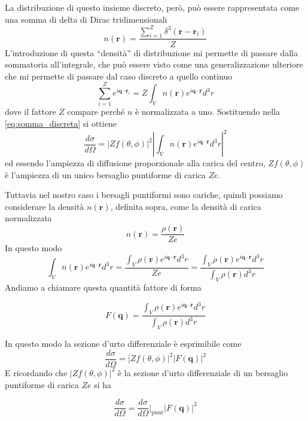 La distribuzione di questo insieme discreto, però, può essere rappresentata come una somma di delta di Dirac tridimensionali
\begin{equation}
    n(\mathbf{r}) = \frac{\sum_{i=1}^Z \delta^3(\mathbf{r} - \mathbf{r}_i)}{Z}
\end{equation}
L'introduzione di questa ``densità'' di distribuzione mi permette di passare dalla sommatoria all'integrale, che può essere visto come una generalizzazione ulteriore che mi permette di passare dal caso discreto a quello continuo
\begin{equation}
    \sum_{i=1}^Z e^{i \mathbf{q}\cdot \mathbf{r}_i} = Z \int_{V}n(\mathbf{r}) e^{i\mathbf{q}\cdot\mathbf{r}} d^3r
\end{equation}
dove il fattore $Z$ compare perché $n$ è normalizzata a uno. Sostituendo nella \eqref{eq:somma_discreta} si ottiene
\begin{equation}
    \frac{d\sigma}{d\Omega} = |Z f(\theta,\phi)|^2 \left| \int_{V}n(\mathbf{r}) e^{i\mathbf{q}\cdot\mathbf{r}} d^3r \right|^2
\end{equation}
ed essendo l'ampiezza di diffusione proporzionale alla carica del centro, $Z f(\theta,\phi)$ è l'ampiezza di un unico bersaglio puntiforme di carica $Ze$.

Tuttavia nel nostro caso i bersagli puntiformi sono cariche, quindi possiamo considerare la densità $n(\mathbf{r})$, definita sopra, come la densità di carica normalizzata 
\begin{equation}
    n(\mathbf{r}) = \frac{\rho(\mathbf{r})}{Ze}
\end{equation}
In questo modo 
\begin{equation}
    \int_{V}n(\mathbf{r}) e^{i\mathbf{q}\cdot\mathbf{r}} d^3r = \frac{\int_{V}\rho(\mathbf{r}) e^{i\mathbf{q}\cdot\mathbf{r}} d^3r}{Ze} = \frac{\int_{V}\rho(\mathbf{r}) e^{i\mathbf{q}\cdot\mathbf{r}} d^3r}{\int_V \rho(\mathbf{r}) d^3r}
\end{equation}
Andiamo a chiamare questa quantità fattore di forma
\begin{tcolorbox}[colback=black!5!white, colframe=black!45!white, boxrule=0.8pt]
\begin{equation}
    F(\mathbf{q}) = \frac{\int_{V}\rho(\mathbf{r}) e^{i\mathbf{q}\cdot\mathbf{r}} d^3r}{\int_V \rho(\mathbf{r}) d^3r}
\end{equation}
\end{tcolorbox}
In questo modo la sezione d'urto differenziale è esprimibile come 
\begin{equation}
    \frac{d\sigma}{d\Omega} = |Z f(\theta,\phi)|^2 \left| F(\mathbf{q}) \right|^2
\end{equation}
E ricordando che $|Z f(\theta,\phi)|^2$ è la sezione d'urto differenziale di un bersaglio puntiforme di carica $Ze$ si ha
\begin{tcolorbox}[colback=black!5!white, colframe=black!45!white, boxrule=0.8pt]
\begin{equation}
    \frac{d\sigma}{d\Omega} = \frac{d\sigma}{d\Omega}\bigg|_{\text{punt}} \left| F(\mathbf{q}) \right|^2
\end{equation}  
\end{tcolorbox}

